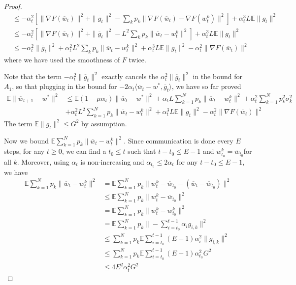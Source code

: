 \begin{proof}
\begin{align*}
		& \leq-\alpha_{t}^{2}\left[\|\nabla F(\overline{w}_{t})\|^{2}+\|\overline{g}_{t}\|^{2}-\sum_{k}p_{k}\|\nabla F(\overline{w}_{t})-\nabla F(w_{t}^{k})\|^{2}\right]+\alpha_{t}^{3}L\mathbb{E}\|g_{t}\|^{2}\\
		& \leq-\alpha_{t}^{2}\left[\|\nabla F(\overline{w}_{t})\|^{2}+\|\overline{g}_{t}\|^{2}-L^{2}\sum_{k}p_{k}\|\overline{w}_{t}-w_{t}^{k}\|^{2}\right]+\alpha_{t}^{3}L\mathbb{E}\|g_{t}\|^{2}\\
		& \leq-\alpha_{t}^{2}\|\overline{g}_{t}\|^{2}+\alpha_{t}^{2}L^{2}\sum_{k}p_{k}\|\overline{w}_{t}-w_{t}^{k}\|^{2}+\alpha_{t}^{3}L\mathbb{E}\|g_{t}\|^{2}-\alpha_{t}^{2}\|\nabla F(\overline{w}_{t})\|^{2}
		\end{align*}
		where we have used the smoothness of $F$ twice. 
		
		Note that the term $-\alpha_{t}^{2}\|\overline{g}_{t}\|^{2}$ exactly
		cancels the $\alpha_{t}^{2}\|\overline{g}_{t}\|^{2}$ in the bound
		for $A_{1}$, so that plugging in the bound for $-2\alpha_{t}\langle\overline{w}_{t}-w^{\ast},\overline{g}_{t}\rangle$,
		we have so far proved 
		\begin{align*}
		\mathbb{E}\|\overline{w}_{t+1}-w^{\ast}\|^{2} & \leq\mathbb{E}(1-\mu\alpha_{t})\|\overline{w}_{t}-w^{\ast}\|^{2}+\alpha_{t}L\sum_{k=1}^{N}p_{k}\|\overline{w}_{t}-w_{t}^{k}\|^{2}+\alpha_{t}^{2}\sum_{k=1}^{N}p_{k}^{2}\sigma_{k}^{2}\\
		& +\alpha_{t}^{2}L^{2}\sum_{k=1}^{N}p_{k}\|\overline{w}_{t}-w_{t}^{k}\|^{2}+\alpha_{t}^{3}L\mathbb{E}\|g_{t}\|^{2}-\alpha_{t}^{2}\|\nabla F(\overline{w}_{t})\|^{2}
		\end{align*}
		The term $\mathbb{E}\|g_{t}\|^{2}\leq G^{2}$ by assumption. 
		
		Now we bound $\mathbb{E}\sum_{k=1}^{N}p_{k}\|\overline{w}_{t}-w_{t}^{k}\|^{2}$.
		Since communication is done every $E$ steps, for any $t\geq0$, we
		can find a $t_{0}\leq t$ such that $t-t_{0}\leq E-1$ and $w_{t_{0}}^{k}=\overline{w}_{t_{0}}$for
		all $k$. Moreover, using $\alpha_{t}$ is non-increasing and $\alpha_{t_{0}}\leq2\alpha{}_{t}$
		for any $t-t_{0}\leq E-1$, we have 
		\begin{align*}
		\mathbb{E}\sum_{k=1}^{N}p_{k}\|\overline{w}_{t}-w_{t}^{k}\|^{2} & =\mathbb{E}\sum_{k=1}^{N}p_{k}\|w_{t}^{k}-\overline{w}_{t_{0}}-(\overline{w}_{t}-\overline{w}_{t_{0}})\|^{2}\\
		& \leq\mathbb{E}\sum_{k=1}^{N}p_{k}\|w_{t}^{k}-\overline{w}_{t_{0}}\|^{2}\\
		& =\mathbb{E}\sum_{k=1}^{N}p_{k}\|w_{t}^{k}-w_{t_{0}}^{k}\|^{2}\\
		& =\mathbb{E}\sum_{k=1}^{N}p_{k}\|-\sum_{i=t_{0}}^{t-1}\alpha_{i}g_{i,k}\|^{2}\\
		& \leq\sum_{k=1}^{N}p_{k}\mathbb{E}\sum_{i=t_{0}}^{t-1}(E-1)\alpha_{i}^{2}\|g_{i,k}\|^{2}\\
		& \leq\sum_{k=1}^{N}p_{k}\mathbb{E}\sum_{i=t_{0}}^{t-1}(E-1)\alpha_{t_{0}}^{2}G^{2}\\
		& \leq4E^{2}\alpha_{t}^{2}G^{2}
		\end{align*}
		

\end{proof}

